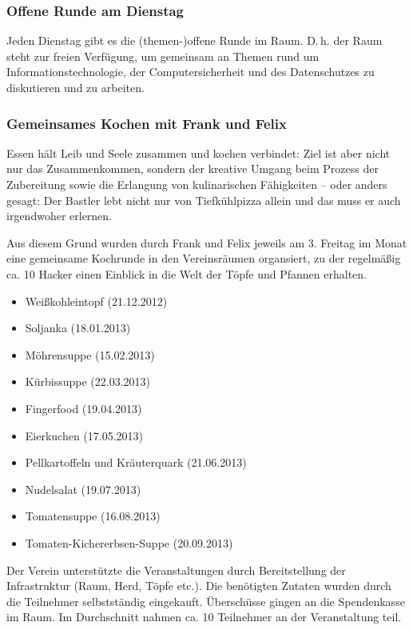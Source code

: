 \documentclass[10pt,DIV16]{scrartcl}
\begin{document}
\subsubsection{Offene Runde am Dienstag}

Jeden Dienstag gibt es die (themen-)offene Runde im Raum. D.\,h. der Raum
steht zur freien Verfügung, um gemeinsam an Themen rund um
Informationstechnologie, der Computersicherheit und des
Datenschutzes zu diskutieren und zu arbeiten.

\subsubsection{Gemeinsames Kochen mit Frank und Felix}

Essen hält Leib und Seele zusammen und kochen verbindet:
Ziel ist aber nicht nur das Zusammenkommen, sondern der kreative Umgang
beim Prozess der Zubereitung sowie die Erlangung von kulinarischen
Fähigkeiten -- oder anders gesagt: Der Bastler lebt nicht nur von
Tiefkühlpizza allein und das muss er auch irgendwoher erlernen.

Aus diesem Grund wurden durch Frank und Felix jeweils am 3. Freitag
im Monat eine gemeinsame Kochrunde in den Vereinsräumen organsiert,
zu der regelmäßig ca. 10 Hacker einen Einblick in die Welt der Töpfe
und Pfannen erhalten.

\begin{itemize}
	\item Weißkohleintopf (21.12.2012)
	\item Soljanka (18.01.2013)
	\item Möhrensuppe (15.02.2013)
	\item Kürbissuppe (22.03.2013)
	\item Fingerfood (19.04.2013)
	\item Eierkuchen (17.05.2013)
	\item Pellkartoffeln und Kräuterquark (21.06.2013)
	\item Nudelsalat (19.07.2013)
	\item Tomatensuppe (16.08.2013)
	\item Tomaten-Kichererbsen-Suppe (20.09.2013)
\end{itemize}

Der Verein unterstützte die Veranstaltungen durch Bereitstellung der
Infrastruktur (Raum, Herd, Töpfe etc.). Die benötigten Zutaten wurden
durch die Teilnehmer selbstständig eingekauft. Überschüsse gingen an
die Spendenkasse im Raum. Im Durchschnitt nahmen ca. 10 Teilnehmer an
der Veranstaltung teil.
\end{document}

